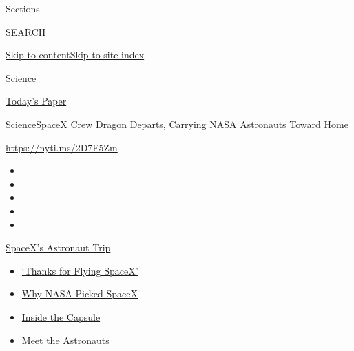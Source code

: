 Sections

SEARCH

\protect\hyperlink{site-content}{Skip to
content}\protect\hyperlink{site-index}{Skip to site index}

\href{https://www.nytimes3xbfgragh.onion/section/science}{Science}

\href{https://myaccount.nytimes3xbfgragh.onion/auth/login?response_type=cookie\&client_id=vi}{}

\href{https://www.nytimes3xbfgragh.onion/section/todayspaper}{Today's
Paper}

\href{/section/science}{Science}\textbar{}SpaceX Crew Dragon Departs,
Carrying NASA Astronauts Toward Home

\url{https://nyti.ms/2D7F5Zm}

\begin{itemize}
\item
\item
\item
\item
\item
\end{itemize}

\href{https://www.nytimes3xbfgragh.onion/2020/08/02/science/spacex-astronauts-splashdown.html?action=click\&pgtype=Article\&state=default\&region=TOP_BANNER\&context=storylines_menu}{SpaceX's
Astronaut Trip}

\begin{itemize}
\tightlist
\item
  \href{https://www.nytimes3xbfgragh.onion/2020/08/02/science/spacex-astronauts-splashdown.html?action=click\&pgtype=Article\&state=default\&region=TOP_BANNER\&context=storylines_menu}{`Thanks
  for Flying SpaceX'}
\item
  \href{https://www.nytimes3xbfgragh.onion/2020/05/26/science/spacex-launch-nasa.html?action=click\&pgtype=Article\&state=default\&region=TOP_BANNER\&context=storylines_menu}{Why
  NASA Picked SpaceX}
\item
  \href{https://www.nytimes3xbfgragh.onion/interactive/2020/05/26/science/spacex-nasa.html?action=click\&pgtype=Article\&state=default\&region=TOP_BANNER\&context=storylines_menu}{Inside
  the Capsule}
\item
  \href{https://www.nytimes3xbfgragh.onion/2020/05/27/science/bob-behnken-doug-hurley.html?action=click\&pgtype=Article\&state=default\&region=TOP_BANNER\&context=storylines_menu}{Meet
  the Astronauts}
\end{itemize}

